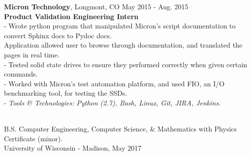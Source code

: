 \documentclass{resume}
\begin{document}
\begin{flushleft}
\textbf{Micron Technology}, Longmont, CO \hfill May 2015 - Aug. 2015\\
\textbf{Product Validation Engineering Intern}\\
{\footnotesize
\ttab- Wrote python program that manipulated Micron's script documentation to convert Sphinx docs to Pydoc docs. \\ \ttab Application allowed user to browse through documentation, and translated the pages in real time.\\
\ttab- Tested solid state drives to ensure they performed correctly when given certain commands.\\
\ttab- Worked with Micron's test automation platform, and used FIO, an I/O benchmarking tool, for testing the SSDs.\\
\ttab- \textit{Tools \& Technologies: Python (2.7), Bash, Linux, Git, JIRA, Jenkins.}\\[5mm]
}

 \\
{\bigsize
	B.S. Computer Engineering, Computer Science, \& Mathematics with Physics Certificate (minor). \\
	University of Wisconsin - Madison, May 2017 } \\[5mm]






\end{flushleft}
\end{document}
